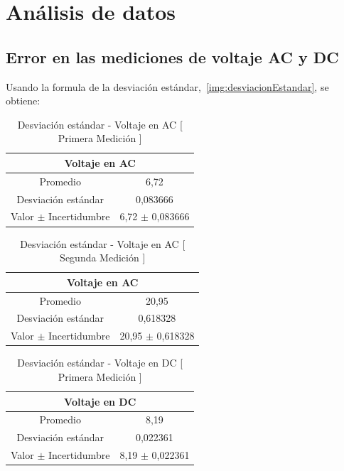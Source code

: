 \documentclass[letterpaper, 12pt]{report}
\begin{document}
\section{Análisis de datos}

\subsection{Error en las mediciones de voltaje AC y DC}

Usando la formula de la desviación estándar,~\ref{img:desviacionEstandar},
se obtiene:

\begin{table}[H]
	\begin{center}
		\begin{tabular}{|c|c|}
			\multicolumn{2}{c}{Voltaje en AC}               \\ \hline
			Promedio                  & 6,72                \\ \hline
			Desviación estándar       & 0,083666            \\ \hline
			Valor $\pm$ Incertidumbre & 6,72 $\pm$ 0,083666 \\ \hline
		\end{tabular}
		\caption{Desviación estándar - Voltaje en AC [ Primera Medición ]}
	\end{center}
\end{table}

\begin{table}[H]
	\begin{center}
		\begin{tabular}{|c|c|}
			\multicolumn{2}{c}{Voltaje en AC}                 \\ \hline
			Promedio                  & 20,95                 \\ \hline
			Desviación estándar       & 0,618328              \\ \hline
			Valor $\pm$ Incertidumbre & 20,95  $\pm$ 0,618328 \\ \hline
		\end{tabular}
		\caption{Desviación estándar - Voltaje en AC [ Segunda Medición ]}
	\end{center}
\end{table}

\begin{table}[H]
	\begin{center}
		\begin{tabular}{|c|c|}
			\multicolumn{2}{c}{Voltaje en DC}               \\ \hline
			Promedio                  & 8,19                \\ \hline
			Desviación estándar       & 0,022361            \\ \hline
			Valor $\pm$ Incertidumbre & 8,19 $\pm$ 0,022361 \\ \hline
		\end{tabular}
		\caption{Desviación estándar - Voltaje en DC [ Primera Medición ]}
	\end{center}
\end{table}
\end{document}
